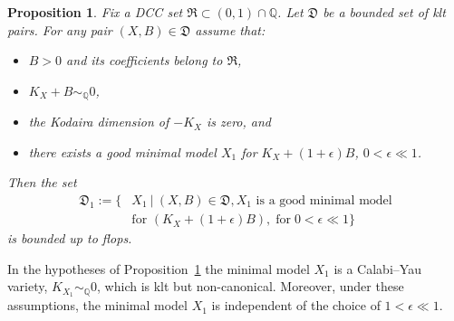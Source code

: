 \documentclass[11pt]{ip-journal}
\newtheorem{proposition}[theorem]{Proposition}
\theoremstyle{definition}
\newcommand{\bQ}{\mathbb{Q}}
\begin{document}
\begin{proposition}
\label{flops.lcy.family.prop}
Fix a DCC set $\mathfrak{R} \subset (0, 1) \cap \bQ$.
Let $\mathfrak{D}$ be a bounded set of klt pairs.
For any pair $(X, B) \in \mathfrak{D}$ assume that: 
\begin{itemize}
\item 
$B > 0$ and its coefficients belong to $\mathfrak{R}$,

\item 
$K_X+B \sim_\bQ 0$,

\item 
the Kodaira dimension of $-K_X$ is zero, and

\item 
there exists a good minimal model $X_1$ for $K_X+(1+\epsilon) B$, $0< \epsilon \ll 1$.
\end{itemize}   
Then the set 
\begin{align*}
\mathfrak{D}_1:=
\{ &
X_1 \ \vert
\ (X, B) \in \mathfrak D, 
X_1 \textrm{ is a good minimal model}
\\ 
&
\textrm{for } (K_X+(1+\epsilon)B), \; 
\textrm{for} \; 
0< \epsilon \ll 1
\}
\end{align*}
is bounded up to flops.
\end{proposition}

In the hypotheses of Proposition~\ref{flops.lcy.family.prop} the minimal model $X_1$ is a Calabi--Yau variety, $K_{X_1} \sim_\bQ 0$, which is klt but non-canonical.
Moreover, under these assumptions, the minimal model $X_1$ is independent of the choice of $1< \epsilon \ll 1$.
\end{document}
